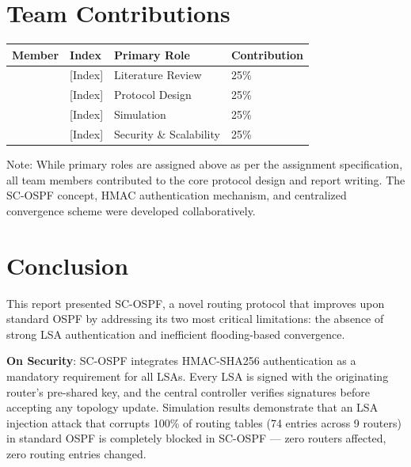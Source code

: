 \documentclass[12pt,a4paper]{article}
\begin{document}
\section{Team Contributions}

\begin{center}
\begin{tabular}{llll}
\toprule
\textbf{Member} & \textbf{Index} & \textbf{Primary Role} & \textbf{Contribution} \\
\midrule
[Name 1] & [Index] & Literature Review & 25\% \\
[Name 2] & [Index] & Protocol Design & 25\% \\
[Name 3] & [Index] & Simulation        & 25\% \\
[Name 4] & [Index] & Security \& Scalability & 25\% \\
\bottomrule
\end{tabular}
\end{center}

Note: While primary roles are assigned above as per the assignment specification,
all team members contributed to the core protocol design and report writing.
The SC-OSPF concept, HMAC authentication mechanism, and centralized convergence
scheme were developed collaboratively.

\section{Conclusion}

This report presented SC-OSPF, a novel routing protocol that improves upon
standard OSPF by addressing its two most critical limitations: the absence of
strong LSA authentication and inefficient flooding-based convergence.

\textbf{On Security}: SC-OSPF integrates HMAC-SHA256 authentication as a mandatory
requirement for all LSAs. Every LSA is signed with the originating router's
pre-shared key, and the central controller verifies signatures before accepting
any topology update. Simulation results demonstrate that an LSA injection attack
that corrupts 100\% of routing tables (74 entries across 9 routers) in standard
OSPF is completely blocked in SC-OSPF --- zero routers affected, zero routing
entries changed.
\end{document}
